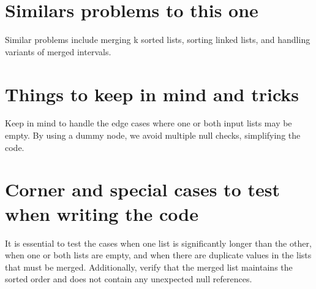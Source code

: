 \section*{Similars problems to this one}
Similar problems include merging k sorted lists, sorting linked lists, and handling variants of merged intervals.

\section*{Things to keep in mind and tricks}
Keep in mind to handle the edge cases where one or both input lists may be empty. By using a dummy node, we avoid multiple null checks, simplifying the code.

\section*{Corner and special cases to test when writing the code}
It is essential to test the cases when one list is significantly longer than the other, when one or both lists are empty, and when there are duplicate values in the lists that must be merged. Additionally, verify that the merged list maintains the sorted order and does not contain any unexpected null references.